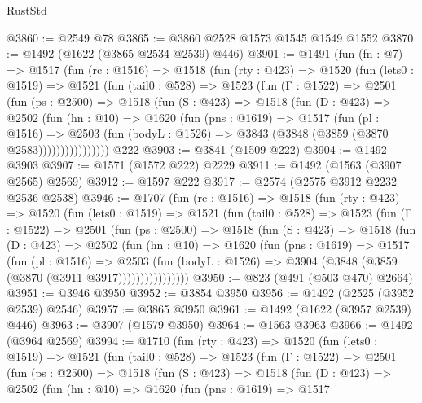 \begin{lexlean}{RustStd}
\begin{coremodule}
@3860 := @2549 @78
@3865 := @3860 @2528 @1573 @1545 @1549 @1552
@3870 := @1492 (@1622 (@3865 @2534 @2539) @446)
@3901 := @1491
    (fun (fn : @7) =>
    @1517
      (fun (rc : @1516) =>
      @1518
        (fun (rty : @423) =>
        @1520
          (fun (lets0 : @1519) =>
          @1521
            (fun (tail0 : @528) =>
            @1523
              (fun (Γ : @1522) =>
              @2501
                (fun (ps : @2500) =>
                @1518
                  (fun (S : @423) =>
                  @1518
                    (fun (D : @423) =>
                    @2502
                      (fun (hn : @10) =>
                      @1620
                        (fun (pns : @1619) =>
                        @1517
                          (fun (pl : @1516) =>
                          @2503
                            (fun (bodyL : @1526) => @3843 (@3848 (@3859 (@3870 @2583))))))))))))))))
    @222
@3903 := @3841 (@1509 @222)
@3904 := @1492 @3903
@3907 := @1571 (@1572 @222) @2229
@3911 := @1492 (@1563 (@3907 @2565) @2569)
@3912 := @1597 @222
@3917 := @2574 (@2575 @3912 @2232 @2536 @2538)
@3946 := @1707
    (fun (rc : @1516) =>
    @1518
      (fun (rty : @423) =>
      @1520
        (fun (lets0 : @1519) =>
        @1521
          (fun (tail0 : @528) =>
          @1523
            (fun (Γ : @1522) =>
            @2501
              (fun (ps : @2500) =>
              @1518
                (fun (S : @423) =>
                @1518
                  (fun (D : @423) =>
                  @2502
                    (fun (hn : @10) =>
                    @1620
                      (fun (pns : @1619) =>
                      @1517
                        (fun (pl : @1516) =>
                        @2503
                          (fun (bodyL : @1526) =>
                          @3904 (@3848 (@3859 (@3870 (@3911 @3917))))))))))))))))
@3950 := @823 (@491 (@503 @470) @2664)
@3951 := @3946 @3950
@3952 := @3854 @3950
@3956 := @1492 (@2525 (@3952 @2539) @2546)
@3957 := @3865 @3950
@3961 := @1492 (@1622 (@3957 @2539) @446)
@3963 := @3907 (@1579 @3950)
@3964 := @1563 @3963
@3966 := @1492 (@3964 @2569)
@3994 := @1710
    (fun (rty : @423) =>
    @1520
      (fun (lets0 : @1519) =>
      @1521
        (fun (tail0 : @528) =>
        @1523
          (fun (Γ : @1522) =>
          @2501
            (fun (ps : @2500) =>
            @1518
              (fun (S : @423) =>
              @1518
                (fun (D : @423) =>
                @2502
                  (fun (hn : @10) =>
                  @1620
                    (fun (pns : @1619) =>
                    @1517

\end{coremodule}
\end{lexlean}
